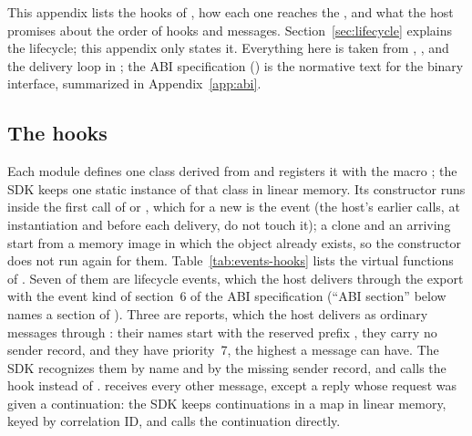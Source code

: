 
This appendix lists the hooks of , how each one
reaches the \paglet{}, and what the host promises about the order of hooks
and messages. Section~\ref{sec:lifecycle} explains the lifecycle; this
appendix only states it. Everything here is taken from
, ,
 and the delivery loop in
; the ABI specification
() is the normative text for the binary
interface, summarized in Appendix~\ref{app:abi}.

\subsection{The hooks}\label{sec:events-hooks}

Each module defines one class derived from  and
registers it with the macro ; the SDK keeps one static
instance of that class in linear memory. Its constructor runs inside the
first call of  or ,
which for a new \paglet{} is the  event (the host's earlier
calls,  at instantiation and 
before each delivery, do not touch it); a clone and an arriving \paglet{}
start from a memory image in which the object already exists, so the
constructor does not run again for them. Table~\ref{tab:events-hooks} lists
the virtual functions of . Seven of them are lifecycle events,
which the host delivers through the export  with
the event kind of section~6 of the ABI specification (``ABI section''
below names a section of ). Three are reports, which the host delivers
as ordinary messages through : their names start
with the reserved prefix , they carry no sender record, and
they have priority~7, the highest a message can have. The SDK recognizes
them by name and by the missing sender record, and calls the hook instead
of .
 receives every other message, except a reply whose
request was given a continuation: the SDK keeps continuations in a map in
linear memory, keyed by correlation ID, and calls the continuation directly.

